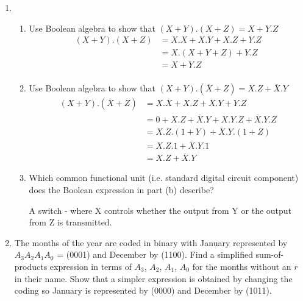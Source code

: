 \documentclass[10pt,\jkfside,a4paper]{article}
\begin{document}
\begin{enumerate}
\item
\begin{enumerate}
\item{Use Boolean algebra to show that $(X + Y).(X + Z) = X + Y.Z$}
\begin{equation*}
\begin{split}
(X + Y).(X + Z) &= X.X + X.Y + X.Z + Y.Z \\
&= X.(X + Y + Z) + Y.Z \\
&= X + Y.Z \\
\end{split}
\end{equation*}
\item{Use Boolean algebra to show that $(X + Y).(\overline X + Z) = X.Z + \overline X.Y$}
\begin{equation*}
\begin{split}
(X + Y).(\overline X + Z) &= X.\overline X + X.Z + \overline X.Y+ Y.Z \\
&= 0 + X.Z + \overline X.Y + X.Y.Z + \overline X.Y.Z \\
&= X.Z.(1 + Y) + \overline X.Y.(1 + Z) \\
&= X.Z.1 + \overline X.Y.1 \\
&= X.Z + \overline X.Y
\end{split}
\end{equation*}
\item{Which common functional unit (i.e. standard digital circuit component) does the Boolean
expression in part (b) describe?}

A switch - where X controls whether the output from Y or the output from Z is transmitted.
\end{enumerate}

\item 
The months of the year are coded in binary with January represented by $A_3A_2A_1A_0$ =
(0001) and December by (1100). Find a simplified sum-of-products expression in terms
of $A_3$, $A_2$, $A_1$, $A_0$ for the months without an $r$ in their name.
Show that a simpler expression is obtained by changing the coding so January is represented by (0000) and December by (1011).


\end{enumerate}
\end{document}
